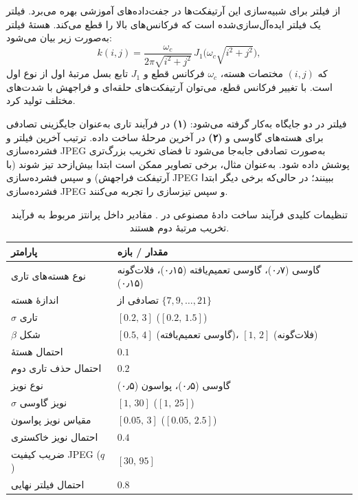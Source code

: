  از فیلتر  برای شبیه‌سازی این آرتیفکت‌ها در جفت‌داده‌های آموزشی بهره می‌برد. فیلتر  یک فیلتر ایده‌آل‌سازی‌شده است که فرکانس‌های بالا را قطع می‌کند. هستهٔ فیلتر  به‌صورت زیر بیان می‌شود:
\begin{equation}
	\label{eq:sinc_kernel}
	k(i,j) = \frac{\omega_{c}}{2\pi\sqrt{i^{2}+j^{2}}}\,J_{1}\!\bigl(\omega_{c}\sqrt{i^{2}+j^{2}}\bigr),
\end{equation}
که $(i,j)$ مختصات هسته، $\omega_{c}$ فرکانس قطع و $J_{1}$ تابع بسل مرتبهٔ اول از نوع اول است. با تغییر فرکانس قطع، می‌توان آرتیفکت‌های حلقه‌ای و فراجهش با شدت‌های مختلف تولید کرد.

فیلتر  در دو جایگاه به‌کار گرفته می‌شود: \textbf{(۱)} در فرآیند تاری به‌عنوان جایگزینی تصادفی برای هسته‌های گاوسی و \textbf{(۲)} در آخرین مرحلهٔ ساخت داده. ترتیب آخرین فیلتر  و فشرده‌سازی JPEG به‌صورت تصادفی جابه‌جا می‌شود تا فضای تخریب بزرگ‌تری پوشش داده شود. به‌عنوان مثال، برخی تصاویر ممکن است ابتدا بیش‌ازحد تیز شوند (با آرتیفکت فراجهش) و سپس فشرده‌سازی JPEG ببینند؛ در حالی‌که برخی دیگر ابتدا فشرده‌سازی JPEG و سپس تیزسازی را تجربه می‌کنند.

\begin{table}[!ht]
	\centering
	\caption{تنظیمات کلیدی فرآیند ساخت دادهٔ مصنوعی در . مقادیر داخل پرانتز مربوط به فرآیند تخریب مرتبهٔ دوم هستند.}
	\label{tbl:deg_settings}
	\renewcommand{\arraystretch}{1.4}
	\begin{tabular}{|l|l|}
		\hline
		\textbf{پارامتر} & \textbf{مقدار / بازه} \\ \hline
		نوع هسته‌های تاری & گاوسی (۰٫۷)، گاوسی تعمیم‌یافته (۰٫۱۵)، فلات‌گونه (۰٫۱۵) \\ \hline
		اندازهٔ هسته & تصادفی از $\{7,9,\ldots,21\}$ \\ \hline
		$\sigma$ تاری & $[0.2,\,3]$ \;($[0.2,\,1.5]$) \\ \hline
		$\beta$ شکل & $[0.5,\,4]$ (گاوسی تعمیم‌یافته)، $[1,\,2]$ (فلات‌گونه) \\ \hline
		احتمال هستهٔ \lr{sinc} & $0.1$ \\ \hline
		احتمال حذف تاری دوم & $0.2$ \\ \hline
		نوع نویز & گاوسی (۰٫۵)، پواسون (۰٫۵) \\ \hline
		$\sigma$ نویز گاوسی & $[1,\,30]$ \;($[1,\,25]$) \\ \hline
		مقیاس نویز پواسون & $[0.05,\,3]$ \;($[0.05,\,2.5]$) \\ \hline
		احتمال نویز خاکستری & $0.4$ \\ \hline
		ضریب کیفیت JPEG ($q$) & $[30,\,95]$ \\ \hline
		احتمال فیلتر \lr{sinc} نهایی & $0.8$ \\ \hline
	\end{tabular}
\end{table}

